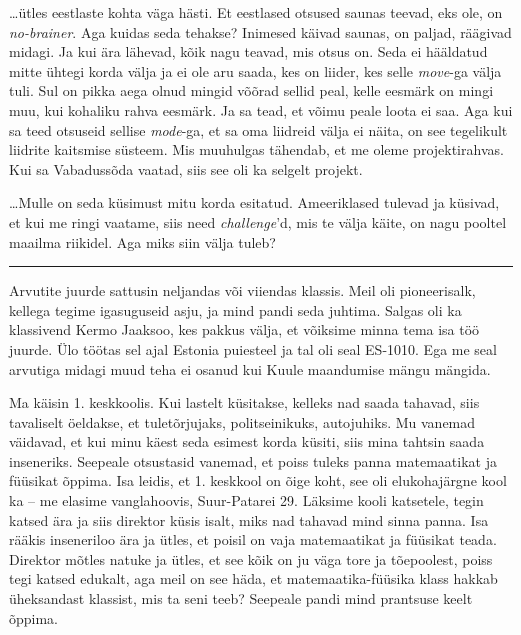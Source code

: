 
\ldots ütles eestlaste kohta väga hästi. Et eestlased otsused saunas 
teevad, eks ole, on \emph{no-brainer}. Aga kuidas seda tehakse? 
Inimesed käivad saunas, on paljad, räägivad midagi. Ja kui ära 
lähevad, kõik nagu teavad, mis otsus on. Seda ei hääldatud mitte ühtegi korda 
välja 
ja ei ole aru saada, kes on liider, kes selle \emph{move}-ga välja tuli. 
Sul on pikka aega olnud mingid võõrad sellid peal, 
kelle eesmärk on mingi muu, kui kohaliku rahva eesmärk. Ja sa tead, et võimu 
peale loota ei saa. Aga kui sa teed otsuseid sellise \emph{mode}-ga, et sa oma 
liidreid välja ei näita, on see tegelikult liidrite kaitsmise süsteem. Mis 
muuhulgas tähendab, et me oleme projektirahvas. Kui sa Vabadussõda vaatad, 
siis see oli ka selgelt projekt.

\ldots Mulle on seda küsimust mitu korda esitatud. Ameeriklased tulevad ja 
küsivad, et kui me ringi vaatame, siis need \emph{challenge}'d, mis te 
välja käite, on nagu pooltel maailma riikidel. Aga miks siin välja tuleb?

\bigskip
\noindent\rule{.3\textwidth}{.7pt}
\bigskip


Arvutite juurde sattusin neljandas või viiendas klassis. Meil oli pioneerisalk, kellega tegime igasuguseid asju, ja mind pandi seda juhtima. Salgas oli ka klassivend Kermo 
Jaaksoo, kes pakkus välja, et võiksime 
minna tema isa töö juurde. Ülo töötas sel ajal 
Estonia puiesteel ja tal oli seal ES-1010. Ega me seal arvutiga midagi muud teha ei 
osanud kui Kuule maandumise mängu mängida. 

Ma käisin 1. keskkoolis. Kui lastelt küsitakse, kelleks nad saada tahavad, siis tavaliselt 
öeldakse, et tuletõrjujaks, politseinikuks, autojuhiks. Mu vanemad 
väidavad, et kui minu käest seda esimest korda küsiti, siis mina tahtsin saada
inseneriks. Seepeale otsustasid
vanemad, et poiss tuleks panna matemaatikat ja füüsikat õppima. Isa leidis, et 1. keskkool on õige koht, see 
oli elukohajärgne kool ka – me elasime vanglahoovis, Suur-Patarei 29. 
Läksime kooli katsetele, tegin katsed ära ja siis direktor küsis isalt, 
miks nad tahavad mind sinna panna. Isa rääkis inseneriloo ära ja ütles, et poisil on vaja 
matemaatikat ja füüsikat teada. Direktor mõtles natuke ja ütles, et see kõik on ju väga tore ja tõepoolest, poiss tegi katsed 
edukalt, aga meil on see häda, et matemaatika-füüsika klass hakkab üheksandast 
klassist, mis ta seni teeb? Seepeale pandi mind prantsuse keelt õppima.

